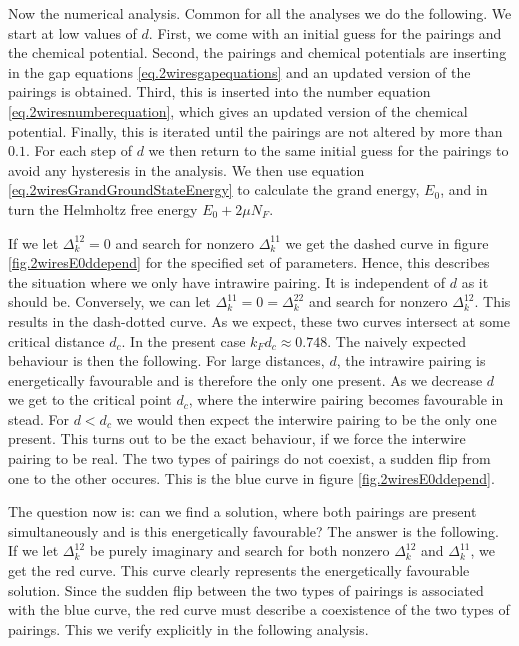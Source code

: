 Now the numerical analysis. Common for all the analyses we do the following. We start at low values of $d$. First, we come with an initial guess for the pairings and the chemical potential. Second, the pairings and chemical potentials are inserting in the gap equations \ref{eq.2wiresgapequations} and an updated version of the pairings is obtained. Third, this is inserted into the number equation \ref{eq.2wiresnumberequation}, which gives an updated version of the chemical potential. Finally, this is iterated until the pairings are not altered by more than $0.1$\textperthousand. For each step of $d$ we then return to the same initial guess for the pairings to avoid any hysteresis in the analysis. We then use equation \eqref{eq.2wiresGrandGroundStateEnergy} to calculate the grand energy, $E_0$, and in turn the Helmholtz free energy $E_0 + 2\mu N_F$.  

If we let $\Delta^{12}_k = 0$ and search for nonzero $\Delta^{11}_k$ we get the dashed curve in figure \ref{fig.2wiresE0ddepend} for the specified set of parameters. Hence, this describes the situation where we only have intrawire pairing. It is independent of $d$ as it should be. Conversely, we can let $\Delta^{11}_k = 0 = \Delta^{22}_k$ and search for nonzero $\Delta^{12}_k$. This results in the dash-dotted curve. As we expect, these two curves intersect at some critical distance $d_c$. In the present case $k_Fd_c \approx 0.748$. The naively expected behaviour is then the following. For large distances, $d$, the intrawire pairing is energetically favourable and is therefore the only one present. As we decrease $d$ we get to the critical point $d_c$, where the interwire pairing becomes favourable in stead. For $d < d_c$ we would then expect the interwire pairing to be the only one present. This turns out to be the exact behaviour, if we force the interwire pairing to be real. The two types of pairings do not coexist, a sudden flip from one to the other occures. This is the blue curve in figure \ref{fig.2wiresE0ddepend}. 

The question now is: can we find a solution, where both pairings are present simultaneously and is this energetically favourable? The answer is the following. If we let $\Delta^{12}_k$ be purely imaginary and search for both nonzero $\Delta^{12}_k$ and $\Delta^{11}_k$, we get the red curve. This curve clearly represents the energetically favourable solution. Since the sudden flip between the two types of pairings is associated with the blue curve, the red curve must describe a coexistence of the two types of pairings. This we verify explicitly in the following analysis. 

